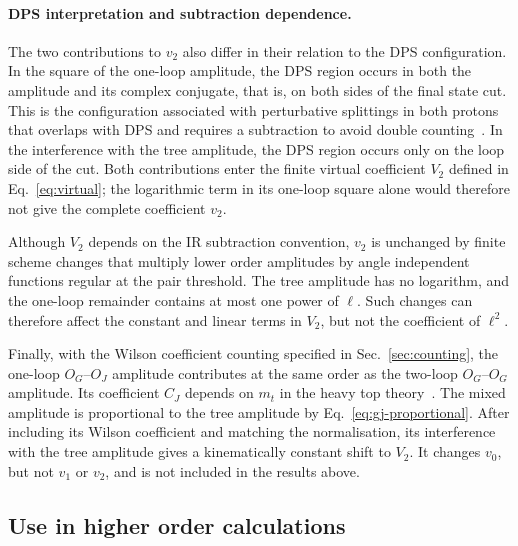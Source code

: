 \paragraph{DPS interpretation and subtraction dependence.}

The two contributions to $v_2$ also differ in their relation to the DPS
configuration. In the square of the one-loop amplitude, the DPS
region occurs in both the amplitude and its complex conjugate, that is,
on both sides of the final state cut. This is the configuration
associated with perturbative splittings in both protons that
overlaps with DPS and requires a subtraction to avoid double
counting~\cite{DiehlGauntSchoenwald2017,DiehlPloessl2026}.
In the interference with the tree amplitude, the DPS region occurs
only on the loop side of the cut. Both contributions enter the
finite virtual coefficient $V_2$ defined in Eq.~\eqref{eq:virtual}; the
logarithmic term in its one-loop square alone would therefore
not give the complete coefficient $v_2$.

Although $V_2$ depends on the IR subtraction convention, $v_2$ is unchanged by finite
scheme changes that multiply lower order amplitudes by angle independent functions
regular at the pair threshold. The tree amplitude has no
logarithm, and the one-loop remainder contains at most one power of $\ell$. Such changes can therefore
affect the constant and linear terms in $V_2$, but not the coefficient of $\ell^2$.

Finally, with the Wilson coefficient counting specified in
Sec.~\ref{sec:counting}, the one-loop $O_G$--$O_J$ amplitude contributes
at the same order as the two-loop $O_G$--$O_G$ amplitude.
Its coefficient $C_J$ depends on $m_t$ in the heavy top theory~\cite{Bhattacharya:2019bmd}.
The mixed amplitude is proportional to the tree amplitude by Eq.~\eqref{eq:gj-proportional}.
After including its Wilson coefficient and matching the normalisation, its interference with the tree amplitude gives a kinematically constant shift to $V_2$.
It changes $v_0$, but not $v_1$ or $v_2$, and is not included in the results above.


\subsection{Use in higher order calculations}
\label{sec:use}

